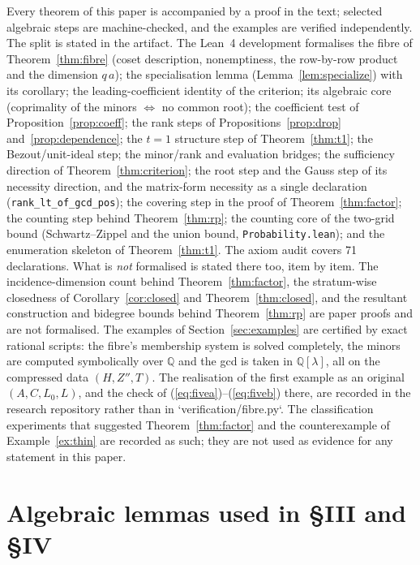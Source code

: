 \documentclass[journal]{IEEEtran}
\theoremstyle{plainn}
\theoremstyle{remark}
\begin{document}
Every theorem of this paper is accompanied by a proof in the text; selected algebraic steps are
machine-checked, and the examples are verified independently. The split is stated in the artifact.
The Lean~4 development formalises the fibre of Theorem~\ref{thm:fibre} (coset description,
nonemptiness, the row-by-row product and the dimension $q\,a$); the specialisation lemma
(Lemma~\ref{lem:specialize}) with its corollary; the leading-coefficient identity of the criterion;
its algebraic core (coprimality of the minors $\iff$ no common root); the coefficient test of
Proposition~\ref{prop:coeff}; the rank steps of Propositions~\ref{prop:drop}
and~\ref{prop:dependence}; the $t=1$ structure step of Theorem~\ref{thm:t1}; the Bezout/unit-ideal
step; the minor/rank and evaluation bridges; the sufficiency direction of
Theorem~\ref{thm:criterion}; the root step and the Gauss step of its necessity direction, and the
matrix-form necessity as a single declaration (\texttt{rank\_lt\_of\_gcd\_pos}); the covering step
in the proof of Theorem~\ref{thm:factor}; the counting step behind Theorem~\ref{thm:rp}; the
counting core of the two-grid bound (Schwartz--Zippel and the union bound, \texttt{Probability.lean});
and the enumeration skeleton of Theorem~\ref{thm:t1}. The axiom audit covers 71 declarations. What is
\emph{not} formalised is stated there too, item by item. The incidence-dimension count behind
Theorem~\ref{thm:factor}, the stratum-wise closedness of Corollary~\ref{cor:closed} and
Theorem~\ref{thm:closed}, and the resultant construction and bidegree bounds behind
Theorem~\ref{thm:rp} are paper proofs and are not formalised. The examples of Section~\ref{sec:examples} are certified by exact
rational scripts: the fibre's membership system is solved completely, the minors are computed
symbolically over $\mathbb Q$ and the gcd is taken in $\mathbb Q[\lambda]$, all on the compressed data
$(H,Z'',T)$. The realisation of the first example as an original $(A,C,L_0,L)$, and the check of
(\ref{eq:fivea})--(\ref{eq:fiveb}) there, are recorded in the research repository rather than in
`verification/fibre.py`. The classification experiments that suggested Theorem~\ref{thm:factor} and the
counterexample of Example~\ref{ex:thin} are recorded as such; they are not used as evidence for
any statement in this paper.

\appendices
\section{Algebraic lemmas used in \S III and \S IV}\label{app:algebra}
\end{document}
